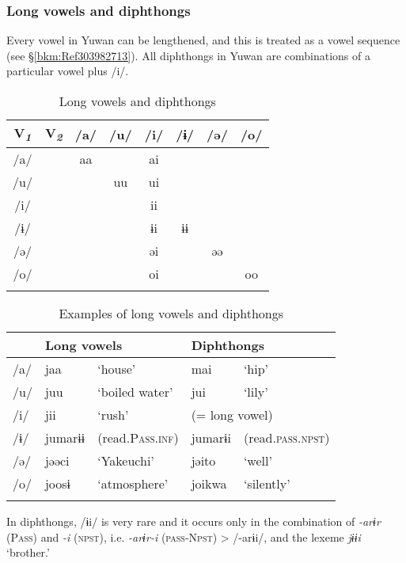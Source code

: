 \subsubsection{Long vowels and diphthongs}
\label{bkm:Ref367392475}\hypertarget{RefHeadingToc395696965}{}\label{bkm:Ref347178348}
Every vowel in Yuwan can be lengthened, and this is treated as a vowel sequence (see §\ref{bkm:Ref303982713}). All diphthongs in Yuwan are combinations of a particular vowel plus /i/.

\begin{table}
\caption{Long vowels and diphthongs}
\begin{tabular}{ *{8}{c} }
\lsptoprule
 V\textit{\textsubscript{1}} & V\textit{\textsubscript{2}} & /a/ & /u/ &  /i/ & /ɨ/ & /ə/ & /o/\\
 \midrule
 /a/  &   & aa & & ai      \\
 /u/  &   & & uu & ui      \\
 /i/  &   & & & ii         \\
 /ɨ/  &   & & & ɨi & ɨɨ    \\
 /ə/  &   & & & əi & & əə  \\
 /o/  &   & & & oi & & & oo\\
\lspbottomrule
\end{tabular}
\end{table}


\begin{table}
\caption{Examples of long vowels and diphthongs}
\begin{tabular}{ *{5}{l} }
\lsptoprule
 & \multicolumn{2}{l}{Long vowels}  & \multicolumn{2}{l}{Diphthongs}\\
 \midrule
{/a/} & {jaa} & {‘house’}  & {mai}  & {‘hip’}\\
{/u/} & {juu} & {‘boiled water’} & {jui} & {‘lily’}\\
{/i/} & {jii} & {‘rush’} & \multicolumn{2}{l}{(= long vowel)}\\
{/ɨ/} & {jumarɨɨ}  & {(read.P\textsc{ass}.\textsc{inf})} & jumarɨi & {(read.\textsc{pass}.\textsc{npst})}\\
{/ə/} & {jəəci} & {‘Yakeuchi’} & {jəito} &   {‘well’}\\
{/o/} & {joosɨ} & {‘atmosphere’}  & {joikwa} &  {‘silently’}\\
\lspbottomrule
\end{tabular}
\end{table}


In diphthongs, /ɨi/ is very rare and it occurs only in the combination of \textit{-arɨr} (P\textsc{ass}) and \textit{-i} (\textsc{npst}), i.e. \textit{-arɨr-i} (\textsc{pass}-N\textsc{pst}) > /-arɨi/, and the lexeme \textit{jɨɨi} ‘brother.’

